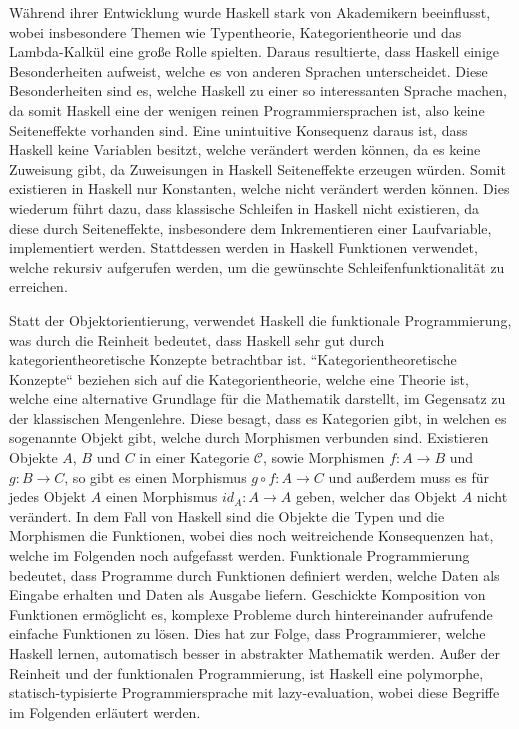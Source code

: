 \documentclass{hhuarticle}
\theoremstyle{definition}
\theoremstyle{theorem}
\begin{document}
  Während ihrer Entwicklung wurde Haskell stark von Akademikern beeinflusst,
  wobei insbesondere Themen wie Typentheorie, Kategorientheorie und das Lambda-Kalkül
  eine große Rolle spielten. Daraus resultierte, dass Haskell
  einige Besonderheiten aufweist, welche es von anderen Sprachen unterscheidet.
  Diese Besonderheiten sind es, welche Haskell zu einer so interessanten
  Sprache machen, da somit Haskell eine der wenigen reinen
  Programmiersprachen ist, also keine Seiteneffekte vorhanden sind.
  Eine unintuitive Konsequenz daraus ist, dass Haskell keine Variablen besitzt,
  welche verändert werden können, da es keine Zuweisung gibt,
  da Zuweisungen in Haskell Seiteneffekte erzeugen würden. Somit
  existieren in Haskell nur Konstanten, welche nicht verändert werden können.
  Dies wiederum führt dazu, dass klassische Schleifen in Haskell nicht existieren,
  da diese durch Seiteneffekte, insbesondere dem Inkrementieren einer
  Laufvariable, implementiert werden. Stattdessen werden in Haskell
  Funktionen verwendet, welche rekursiv aufgerufen werden, um
  die gewünschte Schleifenfunktionalität zu erreichen.

  Statt der Objektorientierung, verwendet Haskell die funktionale
  Programmierung, was durch die Reinheit bedeutet, dass Haskell
  sehr gut durch kategorientheoretische Konzepte betrachtbar ist.
  ``Kategorientheoretische Konzepte`` beziehen sich auf die
  Kategorientheorie, welche eine Theorie ist, welche
  eine alternative Grundlage für die Mathematik darstellt, im Gegensatz
  zu der klassischen Mengenlehre.
  Diese besagt, dass es Kategorien gibt, in welchen es sogenannte Objekt
  gibt, welche durch Morphismen verbunden sind. Existieren
  Objekte $A$, $B$ und $C$ in einer Kategorie $\mathcal{C}$,
  sowie Morphismen $f: A \to B$ und $g: B \to C$, so gibt es einen
  Morphismus $g \circ f: A \to C$ und außerdem muss es für jedes
  Objekt $A$ einen Morphismus $id_A: A \to A$ geben, welcher
  das Objekt $A$ nicht verändert. In dem Fall von Haskell sind die
  Objekte die Typen und die Morphismen die Funktionen, wobei dies noch
  weitreichende Konsequenzen hat, welche im Folgenden noch aufgefasst werden.
  Funktionale Programmierung bedeutet, dass Programme durch Funktionen
  definiert werden, welche Daten als Eingabe erhalten und Daten als
  Ausgabe liefern. Geschickte Komposition von Funktionen ermöglicht
  es, komplexe Probleme durch hintereinander aufrufende einfache
  Funktionen zu lösen.
  Dies hat zur Folge, dass Programmierer, welche Haskell lernen,
  automatisch besser in abstrakter Mathematik werden. Außer der Reinheit
  und der funktionalen Programmierung, ist Haskell eine
  polymorphe, statisch-typisierte Programmiersprache mit
  lazy-evaluation, wobei diese Begriffe im Folgenden erläutert werden.
\end{document}
